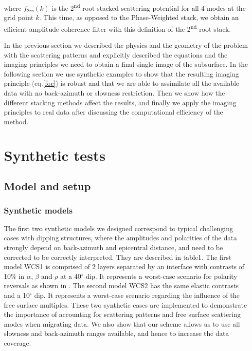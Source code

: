 \documentclass[9pt,a4paper]{article}
\numberwithin{equation}{section}
\begin{document}
\begin{multicols}{2}
\noindent where $f_{2rs}(k)$ is the 2\textsuperscript{nd} root stacked scattering potential for all 4 modes at the grid point $k$.
This time, as opposed to the Phase-Weighted stack, we obtain an efficient amplitude coherence filter with this definition of the 2\textsuperscript{nd} root stack.

In the previous section we described the physics and the geometry of the problem with the scattering patterns and explicitly described the equations and the imaging principles we need to obtain a final single image of the subsurface.
In the following section we use synthetic examples to show that the resulting imaging principle (eq.\eqref{foc}) is robust and that we are able to assimilate all the available data with no back-azimuth or slowness restriction.
Then we show how the different stacking methods affect the results, and finally we apply the imaging principles to real data after discussing the computational efficiency of the method. 


\section{Synthetic tests}

\subsection{Model and setup}

\subsubsection{Synthetic models}

The first two synthetic models we designed correspond to typical challenging cases with dipping structures, where the amplitudes and polarities of the data strongly depend on back-azimuth and epicentral distance, and need to be corrected to be correctly interpreted.
They are described in table1.
The first model WCS1 is comprised of 2 layers separated by an interface with contrasts of 10$\%$ in $\alpha$, $\beta$ and $\rho$ at a 40$^{\circ}$ dip.
It represents a worst-case scenario for polarity reversals as shown in \cite{cheng_gji_16}.
The second model WCS2 has the same elastic contrasts and a 10$^{\circ}$ dip.
It represents a worst-case scenario regarding the influence of the free surface multiples.
These two synthetic cases are implemented to demonstrate the importance of accounting for scattering patterns and free surface scattering modes when migrating data.
We also show that our scheme allows us to use all slowness and back-azimuth ranges available, and hence to increase the data coverage.


\end{multicols}
\end{document}
